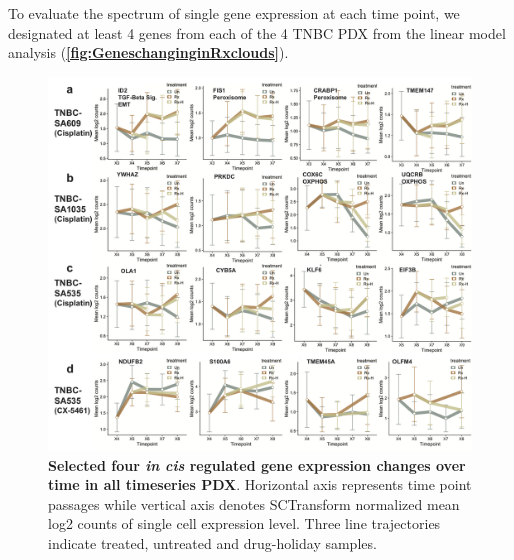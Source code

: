 To evaluate the spectrum of single gene expression at each time point, we designated at least 4 genes from each of the 4 TNBC PDX from the linear model analysis (\textbf{\autoref{fig:GeneschanginginRxclouds}}).


\begin{figure}
\centering
 \includegraphics[width=\textwidth]{Figures/chap5/incisgenelinetrajectories.png}
\caption[Four \textit{in cis} gene expression changed over time]
	{\small
	 \textbf{Selected four \textit{in cis} regulated gene expression changes over time in all timeseries PDX}.
	Horizontal axis represents time point passages while vertical axis denotes SCTransform normalized mean log2 counts of single cell expression level. Three line trajectories indicate treated, untreated and drug-holiday samples. }
	\label{fig:incisgenelinetrajectories}
\end{figure}

 
